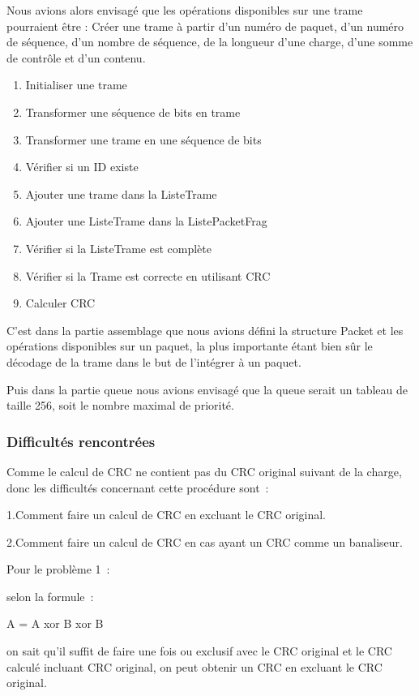 \documentclass[a4paper,11pt]{article}
\begin{document}
Nous avions alors envisagé que les opérations disponibles sur une trame pourraient être :
Créer une trame à partir d'un numéro de paquet, d'un numéro de séquence, d'un nombre de séquence, de la longueur d'une charge, d'une somme de contrôle et d'un contenu.
\begin{enumerate}
 \item Initialiser une trame
 \item Transformer une séquence de bits en trame
 \item Transformer une trame en une séquence de bits
 \item Vérifier si un ID existe
 \item Ajouter une trame dans la ListeTrame
 \item Ajouter une ListeTrame dans la ListePacketFrag
 \item Vérifier si la ListeTrame est complète
 \item Vérifier si la Trame est correcte en utilisant CRC
 \item Calculer CRC
\end{enumerate}

C'est dans la partie assemblage que nous avions défini la structure Packet et les opérations disponibles sur un paquet, la plus importante étant bien sûr le décodage de la trame dans le but de l'intégrer à un paquet.

Puis dans la partie queue nous avions envisagé que la queue serait un tableau de taille 256, soit le nombre maximal de priorité. 


\subsubsection{Difficultés rencontrées}

Comme le calcul de CRC ne contient pas du CRC original suivant de la charge, donc les difficultés concernant cette procédure sont :

1.Comment faire un calcul de CRC en excluant le CRC original.

2.Comment faire un calcul de CRC en cas ayant un CRC comme un banaliseur.

\vspace{0.5cm}

Pour le problème 1 :

selon la formule :

A = A xor B xor B

on sait qu'il suffit de faire une fois ou exclusif avec le CRC original et le CRC calculé incluant CRC original, on peut obtenir un CRC  en excluant le CRC original.
\end{document}
